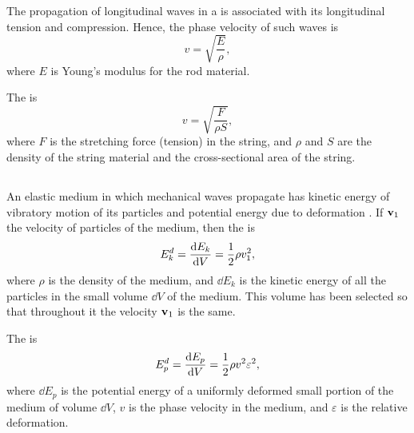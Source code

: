 The propagation of longitudinal waves in a  is associated with its longitudinal tension and compression. Hence, the phase velocity of such waves is
\begin{equation*}%
v = \sqrt{\frac{E}{\rho}},
\end{equation*}
where $E$ is Young's modulus  for the rod material.

The  is
\begin{equation*}%
v = \sqrt{\frac{F}{\rho S}},
\end{equation*}
where $F$ is the stretching force (tension) in the string, and $\rho$ and $S$ are the density of the string material and the cross-sectional area of the string.

\subsection{}\label{30.3.3} An elastic medium in which mechanical waves propagate has kinetic energy of vibratory motion of its particles and potential energy due to deformation . If $\vb{v}_{1}$ the velocity of particles of the medium, then the  is 
\begin{equation*}%
E^{d}_{k} = \dv{E_{k}}{V} = \frac{1}{2} \rho v_{1}^{2},
\end{equation*}
where $\rho$ is the density of the medium, and $\dd E_{k}$ is the kinetic energy of all the particles in the small volume $\dd V$ of the medium. This volume has been selected so that throughout it the velocity $\vb{v}_{1}$ is the same.

The  is
\begin{equation*}%
E^{d}_{p} = \dv{E_{p}}{V} = \frac{1}{2} \rho v^{2} \varepsilon^{2},
\end{equation*}
where $\dd E_{p}$ is the potential energy of a uniformly deformed
small portion of the medium of volume $\dd V$, $v$ is the phase velocity in the medium, and $\varepsilon$ is the relative deformation. 

